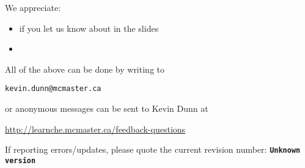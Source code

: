 \documentclass[11pt]{beamer}
\newcommand{\hgversion}{Unknown version}
\begin{document}
\begin{frame}\frametitle{}
	We appreciate:
	\begin{itemize}
		\item	if you let us know about {} in the slides
		\item	{}
	\end{itemize}
	\vskip24pt
	
	\begin{exampleblock}{}
		All of the above can be done by writing to
		\begin{center}
			{\Large \tt kevin.dunn@mcmaster.ca}
		\end{center}
		or anonymous messages can be sent to Kevin Dunn at
		\begin{center}
			{\Large \href{http://learnche.mcmaster.ca/feedback-questions}{http://learnche.mcmaster.ca/feedback-questions}}
		\end{center}
	\end{exampleblock}
	\vskip12pt
	{\scriptsize If reporting errors/updates, please quote the current revision number: \textbf{\tt \hgversion}}
\end{frame}


\end{document}
